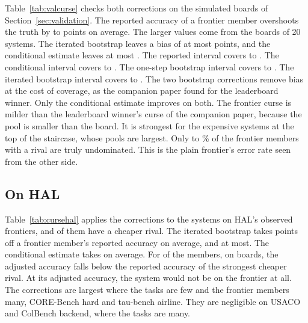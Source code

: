 \documentclass[11pt]{article}
\begin{document}
Table~\ref{tab:valcurse} checks both corrections on the simulated boards of Section~\ref{sec:validation}. The reported accuracy of a frontier member overshoots the truth by \NumCurseValNaiveBiasMin{} to \NumCurseValNaiveBiasMax{} points on average. The larger values come from the boards of 20 systems. The iterated bootstrap leaves a bias of at most \NumCurseValIterBiasAbsMax{} points, and the conditional estimate leaves at most \NumCurseValCondBiasAbsMax{}. The reported interval covers \NumCurseValNaiveCovMin{} to \NumCurseValNaiveCovMax{}. The conditional interval covers \NumCurseValCondCovMin{} to \NumCurseValCondCovMax{}. The one-step bootstrap interval covers \NumCurseValBootCovMin{} to \NumCurseValBootCovMax{}. The iterated bootstrap interval covers \NumCurseValIterCovMin{} to \NumCurseValIterCovMax{}. The two bootstrap corrections remove bias at the cost of coverage, as the companion paper found for the leaderboard winner. Only the conditional estimate improves on both. The frontier curse is milder than the leaderboard winner's curse of the companion paper, because the pool is smaller than the board. It is strongest for the expensive systems at the top of the staircase, whose pools are largest. Only \NumCurseValTrulyUndMin{} to \NumCurseValTrulyUndMax\% of the frontier members with a rival are truly undominated. This is the plain frontier's error rate seen from the other side.

\subsection{On HAL}
\begin{table}[!tbp]
\centering\small
\resizebox{\textwidth}{!}{}
\caption{Selection-adjusted accuracy of the systems on HAL's observed frontiers. Shrinkage: reported accuracy minus the adjusted estimate, in points, over the frontier members that have a cheaper rival. The last column counts the frontier members whose iterated-bootstrap estimate falls below the reported accuracy of their strongest cheaper rival. Every member is listed in the supplement.}
\label{tab:cursehal}
\end{table}
Table~\ref{tab:cursehal} applies the corrections to the \NumCurseMembers{} systems on HAL's observed frontiers, and \NumCurseWithRival{} of them have a cheaper rival. The iterated bootstrap takes \NumCurseMeanShrinkPt{} points off a frontier member's reported accuracy on average, and \NumCurseMaxShrinkPt{} at most. The conditional estimate takes \NumCurseMeanShrinkCondPt{} on average. For \NumCurseBelowRival{} of the \NumCurseMembers{} members, on \NumCurseBoardsBelow{} boards, the adjusted accuracy falls below the reported accuracy of the strongest cheaper rival. At its adjusted accuracy, the system would not be on the frontier at all. The corrections are largest where the tasks are few and the frontier members many, CORE-Bench hard and tau-bench airline. They are negligible on USACO and ColBench backend, where the tasks are many.


\begingroup\small
\endgroup
\end{document}
